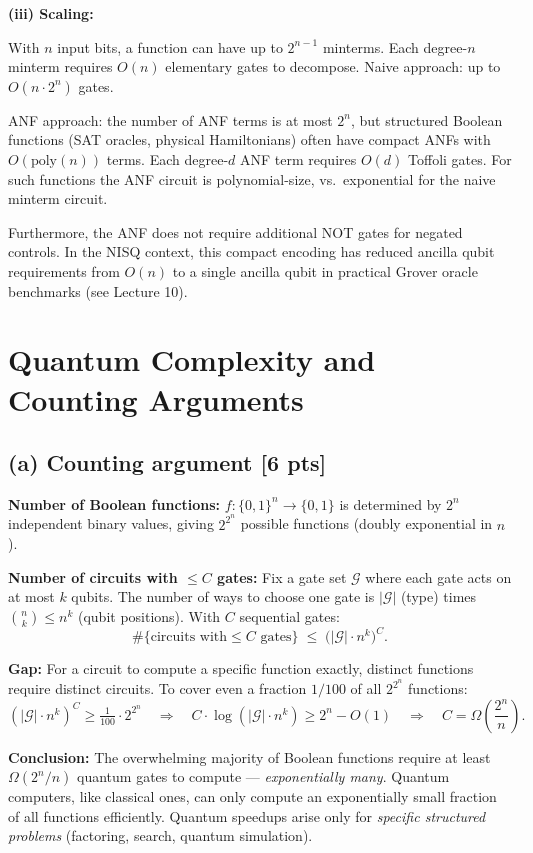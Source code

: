 \documentclass[11pt,a4paper]{article}
\begin{document}
\textbf{(iii) Scaling:}

With $n$ input bits, a function can have up to $2^{n-1}$ minterms.
Each degree-$n$ minterm requires $O(n)$ elementary gates to decompose.
Naive approach: up to $O(n\cdot 2^n)$ gates.

ANF approach: the number of ANF terms is at most $2^n$, but structured Boolean functions
(SAT oracles, physical Hamiltonians) often have compact ANFs with $O(\text{poly}(n))$ terms.
Each degree-$d$ ANF term requires $O(d)$ Toffoli gates.
For such functions the ANF circuit is polynomial-size, vs.\ exponential for the naive minterm circuit.

Furthermore, the ANF does not require additional NOT gates for negated controls.
In the NISQ context, this compact encoding has reduced ancilla qubit requirements from
$O(n)$ to a single ancilla qubit in practical Grover oracle benchmarks (see Lecture 10).

\newpage
\section{Quantum Complexity and Counting Arguments}

\subsection*{(a) Counting argument [6 pts]}

\textbf{Number of Boolean functions:}
$f:\{0,1\}^n\to\{0,1\}$ is determined by $2^n$ independent binary values,
giving $2^{2^n}$ possible functions (doubly exponential in $n$).

\textbf{Number of circuits with $\le C$ gates:}
Fix a gate set $\mathcal{G}$ where each gate acts on at most $k$ qubits.
The number of ways to choose one gate is $|\mathcal{G}|$ (type) times $\binom{n}{k}\le n^k$ (qubit positions).
With $C$ sequential gates:
\[
\#\{\text{circuits with}\le C\text{ gates}\}\;\le\;\bigl(|\mathcal{G}|\cdot n^k\bigr)^C.
\]

\textbf{Gap:}
For a circuit to compute a specific function exactly, distinct functions require distinct circuits.
To cover even a fraction $1/100$ of all $2^{2^n}$ functions:
\[
(|\mathcal{G}|\cdot n^k)^C\ge\tfrac{1}{100}\cdot2^{2^n}
\quad\Rightarrow\quad
C\cdot\log(|\mathcal{G}|\cdot n^k)\ge2^n-O(1)
\quad\Rightarrow\quad
C=\Omega\!\left(\frac{2^n}{n}\right).
\]

\textbf{Conclusion:} The overwhelming majority of Boolean functions require at least $\Omega(2^n/n)$
quantum gates to compute --- \emph{exponentially many}.
Quantum computers, like classical ones, can only compute an exponentially small fraction of all
functions efficiently. Quantum speedups arise only for \emph{specific structured problems}
(factoring, search, quantum simulation).
\end{document}

